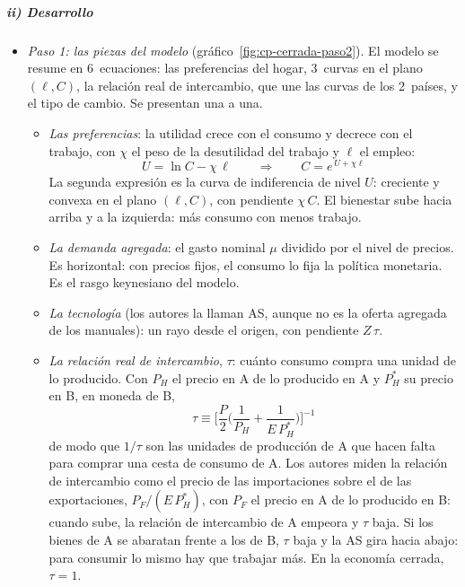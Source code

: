 \documentclass[11pt]{article}
\begin{document}
\subparagraph{ii) Desarrollo}
\begin{itemize}
\item \emph{Paso 1: las piezas del modelo} (gráfico~\ref{fig:cp-cerrada-paso2}). El modelo se resume en 6~ecuaciones: las preferencias del hogar, 3~curvas en el plano $(\ell,C)$, la relación real de intercambio, que une las curvas de los 2~países, y el tipo de cambio. Se presentan una a una.
  \begin{itemize}
  \item \emph{Las preferencias}: la utilidad crece con el consumo y decrece con el trabajo, con $\chi$ el peso de la desutilidad del trabajo y $\ell$ el empleo:
  \begin{equation}
  U=\ln C-\chi\,\ell\qquad\Longrightarrow\qquad C=e^{\,U+\chi\ell}\label{eq:cp-utilidad}
  \end{equation}
  La segunda expresión es la curva de indiferencia de nivel $U$: creciente y convexa en el plano $(\ell,C)$, con pendiente $\chi\,C$. El bienestar sube hacia arriba y a la izquierda: más consumo con menos trabajo.
  \item \emph{La demanda agregada}: el gasto nominal $\mu$ dividido por el nivel de precios.
  Es horizontal: con precios fijos, el consumo lo fija la política monetaria. Es el rasgo keynesiano del modelo.
  \item \emph{La tecnología} (los autores la llaman AS, aunque no es la oferta agregada de los manuales): un rayo desde el origen, con pendiente $Z\,\tau$.
  \item \emph{La relación real de intercambio}, $\tau$: cuánto consumo compra una unidad de lo producido. Con $P_H$ el precio en A de lo producido en A y $P^*_H$ su precio en B, en moneda de B\nocite{CorsettiPesenti2009},
  \begin{equation}
  \tau\equiv\Big[\frac{P}{2}\Big(\frac{1}{P_H}+\frac{1}{E\,P^*_H}\Big)\Big]^{-1}\label{eq:cp-tau}
  \end{equation}
  de modo que $1/\tau$ son las unidades de producción de A que hacen falta para comprar una cesta de consumo de A. Los autores miden la relación de intercambio como el precio de las importaciones sobre el de las exportaciones, $P_F/(E\,P^*_H)$, con $P_F$ el precio en A de lo producido en B: cuando sube, la relación de intercambio de A empeora y $\tau$ baja. Si los bienes de A se abaratan frente a los de B, $\tau$ baja y la AS gira hacia abajo: para consumir lo mismo hay que trabajar más. En la economía cerrada, $\tau=1$.

\end{itemize}
\end{itemize}
\end{document}

